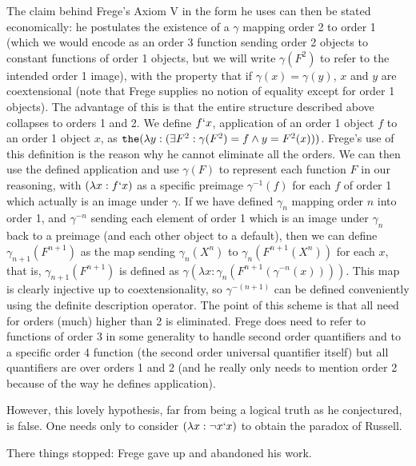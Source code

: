 \documentclass{article}
\begin{document}
{{The claim behind Frege's Axiom V in the form he uses can then be stated economically:  he postulates the existence of a $\gamma$ mapping order 2 to order 1 (which we would encode as an order 3 function sending order 2 objects to constant functions of order 1 objects, but we will write $\gamma(F^2)$ to refer to the intended order 1 image), with the property that if $\gamma(x)=\gamma(y)$, $x$ and $y$ are coextensional (note that Frege supplies no notion of equality except for order 1 objects).  The advantage of this is that the entire structure described above collapses to orders 1 and 2.  We define
$f`x$, application of an order 1 object $f$ to an order 1 object $x$, as ${\tt the}(\lambda y:(\exists F^2:\gamma(F^2) = f \wedge y=F^2(x)))$.  Frege's use of this definition is the reason why he cannot eliminate all the orders.  We can then use the defined application and use $\gamma(F)$ to represent each function $F$ in our reasoning, with
$(\lambda x:f`x)$ as a specific preimage $\gamma^{-1}(f)$ for each $f$ of order 1 which actually is an image under $\gamma$.  If we have defined $\gamma_n$ mapping order $n$ into order 1, and $\gamma^{-n}$ sending each element of order 1 which is an image under $\gamma_n$ back to a preimage (and each other object to a default), then we can define $\gamma_{n+1}(F^{n+1})$
as the map sending $\gamma_n(X^n)$ to $\gamma_n(F^{n+1}(X^n))$ for each $x$, that is, $\gamma_{n+1}(F^{n+1})$ is defined as $\gamma(\lambda x:\gamma_n(F^{n+1}(\gamma^{-n}(x))))$.  This map is clearly injective up to coextensionality, so $\gamma^{-(n+1)}$ can be defined conveniently using the definite description operator.  The point of this scheme is that all need for orders (much) higher than 2 is eliminated.  Frege does need to refer to functions of order 3 in some generality to handle second order quantifiers and to a specific order 4 function (the second order universal quantifier itself) but all quantifiers are over orders 1 and 2 (and he really only needs to mention order 2 because of the way he defines application).

However, this lovely hypothesis, far from being a logical truth as he conjectured, is false.  One needs only to consider $(\lambda x:\neg x`x)$ to obtain the paradox of Russell.

There things stopped:  Frege gave up and abandoned his work.

}}
\end{document}
